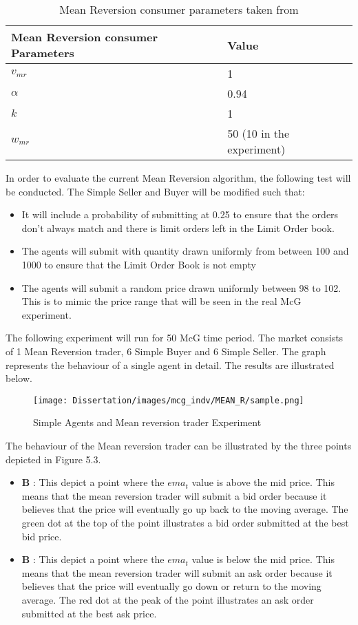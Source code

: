 \begin{table}[h]
\centering
\begin{tabular}{ |m||p{4cm}|} 
\hline
\textbf{Mean Reversion consumer Parameters}& \textbf{Value} \\
\hline
\hline
$v_{mr}$ & 1 \\ 
\hline
$\alpha$ & 0.94\\ 
\hline
$k$ & 1 \\ 
\hline
$w_{mr}$ & 50 (10 in the experiment)\\ 
\hline
\end{tabular}
\caption{Mean Reversion consumer parameters taken from \cite{McGroarty}}  
\end{table}
\FloatBarrier

In order to evaluate the current Mean Reversion algorithm, the following test will be conducted. The Simple Seller and Buyer will be modified such that:
\begin{itemize}
  \item It will include a probability of submitting at 0.25 to ensure that the orders don't always match and there is limit orders left in the Limit Order book. 
  \item The agents will submit with quantity drawn uniformly from between 100 and 1000 to ensure that the Limit Order Book is not empty
  \item The agents will submit a random price drawn uniformly between 98 to 102. This is to mimic the price range that will be seen in the real McG experiment. 
\end{itemize}

The following experiment will run for 50 McG time period. The market consists of 1 Mean Reversion trader, 6 Simple Buyer and 6 Simple Seller. The graph represents the behaviour of a single agent in detail. The results are illustrated below. 

\begin{figure}[h]
\texttt{[image: Dissertation/images/mcg\_indv/MEAN\_R/sample.png]}
\caption{Simple Agents and Mean reversion trader Experiment} 
\end{figure} 
\FloatBarrier

The behaviour of the Mean reversion trader can be illustrated by the three points depicted in Figure 5.3. 
\begin{itemize}
  \item \textbf{B} : This depict a point where the $ema_{t}$ value is above the mid price. This means that the mean reversion trader will submit a bid order because it believes that the price will eventually go up back to the moving average. The green dot at the top of the point illustrates a bid order submitted at the best bid price. 
  \item \textbf{B} : This depict a point where the $ema_{t}$ value is below the mid price. This means that the mean reversion trader will submit an ask order because it believes that the price will eventually go down or return to the moving average. The red dot at the peak of the point illustrates an ask order submitted at the best ask price. 
\end{itemize}

